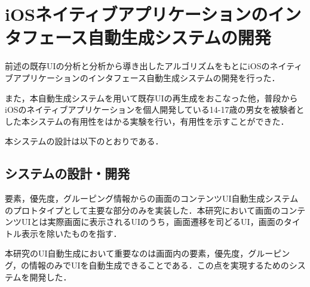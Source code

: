 \chapter{iOSネイティブアプリケーションのインタフェース自動生成システムの開発}
\label{chap:impl}
前述の既存UIの分析と分析から導き出したアルゴリズムをもとにiOSのネイティブアプリケーションのインタフェース自動生成システムの開発を行った．

また，本自動生成システムを用いて既存UIの再生成をおこなった他，普段からiOSのネイティブアプリケーションを個人開発している14-17歳の男女を被験者とした本システムの有用性をはかる実験を行い，有用性を示すことができた．

本システムの設計は以下のとおりである．
\section{システムの設計・開発}
要素，優先度，グルーピング情報からの画面のコンテンツUI自動生成システムのプロトタイプとして主要な部分のみを実装した．本研究において画面のコンテンツUIとは実際画面に表示されるUIのうち，画面遷移を司どるUI，画面のタイトル表示を除いたものを指す．

本研究のUI自動生成において重要なのは画面内の要素，優先度，グルーピング，の情報のみでUIを自動生成できることである．この点を実現するためのシステムを開発した．

